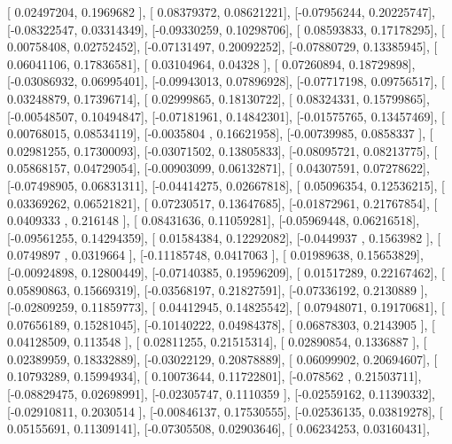 \documentclass{article}
\begin{document}
       [ 0.02497204,  0.1969682 ],
       [ 0.08379372,  0.08621221],
       [-0.07956244,  0.20225747],
       [-0.08322547,  0.03314349],
       [-0.09330259,  0.10298706],
       [ 0.08593833,  0.17178295],
       [ 0.00758408,  0.02752452],
       [-0.07131497,  0.20092252],
       [-0.07880729,  0.13385945],
       [ 0.06041106,  0.17836581],
       [ 0.03104964,  0.04328   ],
       [ 0.07260894,  0.18729898],
       [-0.03086932,  0.06995401],
       [-0.09943013,  0.07896928],
       [-0.07717198,  0.09756517],
       [ 0.03248879,  0.17396714],
       [ 0.02999865,  0.18130722],
       [ 0.08324331,  0.15799865],
       [-0.00548507,  0.10494847],
       [-0.07181961,  0.14842301],
       [-0.01575765,  0.13457469],
       [ 0.00768015,  0.08534119],
       [-0.0035804 ,  0.16621958],
       [-0.00739985,  0.0858337 ],
       [ 0.02981255,  0.17300093],
       [-0.03071502,  0.13805833],
       [-0.08095721,  0.08213775],
       [ 0.05868157,  0.04729054],
       [-0.00903099,  0.06132871],
       [ 0.04307591,  0.07278622],
       [-0.07498905,  0.06831311],
       [-0.04414275,  0.02667818],
       [ 0.05096354,  0.12536215],
       [ 0.03369262,  0.06521821],
       [ 0.07230517,  0.13647685],
       [-0.01872961,  0.21767854],
       [ 0.0409333 ,  0.216148  ],
       [ 0.08431636,  0.11059281],
       [-0.05969448,  0.06216518],
       [-0.09561255,  0.14294359],
       [ 0.01584384,  0.12292082],
       [-0.0449937 ,  0.1563982 ],
       [ 0.0749897 ,  0.0319664 ],
       [-0.11185748,  0.0417063 ],
       [ 0.01989638,  0.15653829],
       [-0.00924898,  0.12800449],
       [-0.07140385,  0.19596209],
       [ 0.01517289,  0.22167462],
       [ 0.05890863,  0.15669319],
       [-0.03568197,  0.21827591],
       [-0.07336192,  0.2130889 ],
       [-0.02809259,  0.11859773],
       [ 0.04412945,  0.14825542],
       [ 0.07948071,  0.19170681],
       [ 0.07656189,  0.15281045],
       [-0.10140222,  0.04984378],
       [ 0.06878303,  0.2143905 ],
       [ 0.04128509,  0.113548  ],
       [ 0.02811255,  0.21515314],
       [ 0.02890854,  0.1336887 ],
       [ 0.02389959,  0.18332889],
       [-0.03022129,  0.20878889],
       [ 0.06099902,  0.20694607],
       [ 0.10793289,  0.15994934],
       [ 0.10073644,  0.11722801],
       [-0.078562  ,  0.21503711],
       [-0.08829475,  0.02698991],
       [-0.02305747,  0.1110359 ],
       [-0.02559162,  0.11390332],
       [-0.02910811,  0.2030514 ],
       [-0.00846137,  0.17530555],
       [-0.02536135,  0.03819278],
       [ 0.05155691,  0.11309141],
       [-0.07305508,  0.02903646],
       [ 0.06234253,  0.03160431],
\end{document}
